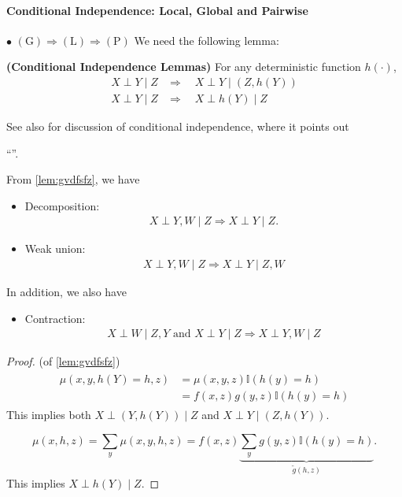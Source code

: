 \documentclass{article}
\newcommand{\bfs}[1]{\textbf{({#1}) }}
\begin{document}
\paragraph{Conditional Independence: Local, Global and Pairwise}
$\bullet$  $(\mathrm{G}) \Rightarrow(\mathrm{L}) \Rightarrow(\mathrm{P})$
We need the following lemma:
\begin{lema}\bfs{Conditional Independence Lemmas}\label{lem:gvdfsfz}
For any deterministic function $h(\cdot)$,
\begin{align}
X \perp Y \mid Z & \Longrightarrow \quad X \perp Y \mid(Z, h(Y)) \label{eq:hdfe}\\
X \perp Y \mid Z & \Longrightarrow \quad X \perp h(Y) \mid Z \label{eq:mbdre}
\end{align}
\end{lema}
\begin{rema}
See also \cite[Page 216]{durrett2019probability} for discussion of conditional independence, where it points out  
\centerline{``''.}

\end{rema}
\begin{cora}\label{cora:dfax}From \cref{lem:gvdfsfz}, we have
\begin{itemize} 
    \item Decomposition:
\begin{align*}
{X} \perp {Y}, {W} \mid {Z} \Longrightarrow {X} \perp {Y} \mid {Z}.
\end{align*}
\item Weak union:
\begin{align*}
{X} \perp {Y}, {W} \mid {Z} \Longrightarrow {X} \perp {Y} \mid {Z}, {W}
\end{align*}
\end{itemize}
In addition, we also have 
\begin{itemize}
\item Contraction:
\begin{align*}
{X} \perp {W} \mid {Z}, {Y} \text{ and } {X} \perp {Y} \mid {Z} \Longrightarrow {X} \perp {Y}, {W} \mid {Z}
\end{align*}
\end{itemize}
\end{cora}
\begin{proof} (of \cref{lem:gvdfsfz})
\begin{align*}
\begin{aligned}
\mu(x, y, h(Y)=h, z) &=\mu(x, y, z) \mathbb{I}(h(y)=h) \\
&=f(x, z) g(y, z) \mathbb{I}(h(y)=h)
\end{aligned}
\end{align*}
This implies both $X \perp(Y, h(Y)) \mid Z$ and $X \perp Y \mid(Z, h(Y))$.

$$\mu(x, h, z)=\sum_{y} \mu(x, y, h, z)=f(x, z) \underbrace{\sum_{y} g(y, z) \mathbb{I}(h(y)=h)}_{\tilde{g}(h, z)}.$$ This implies $X \perp h(Y) \mid Z$.
\end{proof}
\end{document}
